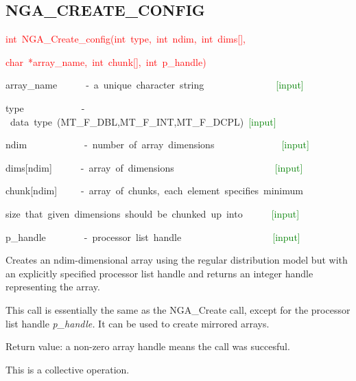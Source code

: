 \subsection*{\label{sub:NGA_CREATE_CONFIG}NGA\_CREATE\_CONFIG}
\begin{lyxcode}
\textcolor{red}{int~NGA\_Create\_config(int~type,~int~ndim,~int~dims{[}{]},~}

\textcolor{red}{char~{*}array\_name,~int~chunk{[}{]},~int~p\_handle)}



array\_name~~~~~~-~a~unique~character~string~~~~~~~~~~~~~~~\textcolor{green}{{[}input{]}}~

type~~~~~~~~~~~~-~data~type~(MT\_F\_DBL,MT\_F\_INT,MT\_F\_DCPL)~\textcolor{green}{{[}input{]}}~

ndim~~~~~~~~~~~~-~number~of~array~dimensions~~~~~~~~~~~~~~\textcolor{green}{{[}input{]}}~

dims{[}ndim{]}~~~~~~-~array~of~dimensions~~~~~~~~~~~~~~~~~~~~~\textcolor{green}{{[}input{]}}~

chunk{[}ndim{]}~~~~~-~array~of~chunks,~each~element~specifies~minimum~

size~that~given~dimensions~should~be~chunked~up~into~~~~~~\textcolor{green}{{[}input{]}~}

p\_handle~~~~~~~~-~processor~list~handle~~~~~~~~~~~~~~~~~~~\textcolor{green}{{[}input{]}}
\end{lyxcode}
Creates an ndim-dimensional array using the regular distribution model
but with an explicitly specified processor list handle and returns
an integer handle representing the array.

This call is essentially the same as the NGA\_Create call, except
for the processor list handle \emph{p\_handle.} It can be used to
create mirrored arrays.

Return value: a non-zero array handle means the call was succesful. 

This is a collective operation. 


